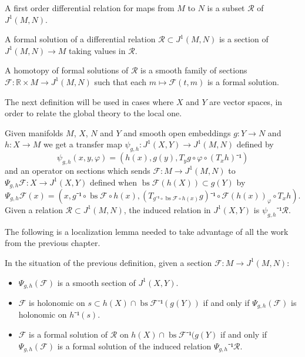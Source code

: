 \documentclass[10pt,a4paper]{article}
\newcounter{chapter}
\newcommand{\Rel}{\mathcal{R}} %
\newcommand{\F}{\mathcal{F}} %
\DeclareMathOperator{\bs}{bs} %
\newcommand{\uses}[1]{}
\newcommand{\lean}[1]{}
\newcommand{\leanok}{}
\begin{document}
\begin{definition}
  \label{def:rel}
  \leanok
  \lean{RelMfld}
  \uses{def:one_jet_space}
  A first order differential relation for maps from $M$ to $N$ is a
  subset $\Rel$ of $J^1(M, N)$.
\end{definition}

\begin{definition}
  \label{def:formal_sol}
  \leanok
  \lean{FormalSol}
  \uses{def:rel, def:one_jet_extension}
  A formal solution of a differential relation $\Rel ⊂ J^1(M, N)$ is a
  section of $J^1(M, N) → M$ taking values in $\Rel$.
\end{definition}


\begin{definition}
  \label{def:htpy_formal_sol}
  \leanok
  \lean{HtpyFormalSol}
  \uses{def:formal_sol}
  A homotopy of formal solutions of $\Rel$ is a smooth family of sections
  $\F : ℝ × M → J^1(M, N)$ such that each $m ↦ \F(t, m)$ is a formal solution.
\end{definition}

The next definition will be used in cases where $X$ and $Y$ are vector spaces,
in order to relate the global theory to the local one.

\begin{definition}
  \label{def:transfer_map}
  \leanok %
  \lean{OpenSmoothEmbedding.transfer, OneJetSec.localize, RelMfld.localize}
  \uses{def:one_jet_space}
  Given manifolds $M$, $X$, $N$ and $Y$ and smooth open embeddings $g : Y → N$
  and $h : X → M$ we get a transfer map $ψ_{g, h} : J^1(X, Y) → J^1(M, N)$
  defined by
  \[
    ψ_{g, h}(x, y, φ) = (h(x), g(y), T_yg ∘ φ ∘ (T_xh)⁻¹)
  \]
  and an operator on sections which sends $\F : M → J^1(M, N)$ to
  $Ψ_{g, h}\F : X → J^1(X, Y)$ defined when $\bs\F(h(X)) ⊂ g(Y)$ by
  \[
    Ψ_{g, h}\F(x) = (x, g⁻¹ ∘ \bs\F ∘ h(x), (T_{g⁻¹ ∘ \bs\F ∘ h(x)}g)⁻¹ ∘ \F(h(x))_φ ∘ T_xh).
  \]
  Given a relation $\Rel ⊂ J^1(M, N)$, the induced relation in $J^1(X, Y)$
  is $ψ_{g, h}⁻¹\Rel$.
\end{definition}

The following is a localization lemma needed to take advantage of all the work
from the previous chapter.

\begin{lemma}
  \label{lem:transfer}
  \leanok
  \lean{OneJetSec.localize, isHolonomicAt_localize_iff, OneJetSec.localize_mem_iff}
  \uses{def:transfer_map, def:holonomic_section, def:formal_sol}
  In the situation of the previous definition, given a section $\F : M → J^1(M, N)$:
  \begin{itemize}
    \item $Ψ_{g, h}(\F)$ is a smooth section of $J^1(X, Y)$.
    \item $\F$ is holonomic on $s ⊂ h(X) ∩ \bs\F⁻¹(g(Y))$ if and only if $Ψ_{g, h}(\F)$
      is holonomic on $h⁻¹(s)$.
    \item $\F$ is a formal solution of $\Rel$ on $h(X) ∩ \bs\F⁻¹(g(Y)$ if and only if $Ψ_{g, h}(\F)$
      is a formal solution of the induced relation $Ψ_{g, h}⁻¹\Rel$.
  \end{itemize}
\end{lemma}
\end{document}
